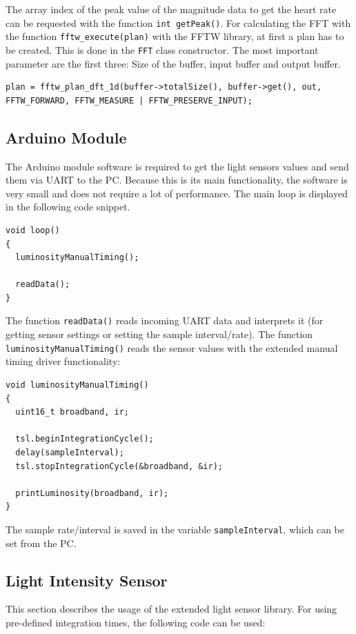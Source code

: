 \documentclass[notitlepage]{scrreprt}
\begin{document}
The array index of the peak value of the magnitude data to get the heart rate can be requested with the function \lstinline{int getPeak()}. For calculating the FFT with the function \lstinline{fftw_execute(plan)} with the FFTW library, at first a plan has to be created. This is done in the \lstinline{FFT} class constructor. The most important parameter are the first three: Size of the buffer, input buffer and output buffer.

\begin{lstlisting}[caption=FFT.c]
plan = fftw_plan_dft_1d(buffer->totalSize(), buffer->get(), out, FFTW_FORWARD, FFTW_MEASURE | FFTW_PRESERVE_INPUT);
\end{lstlisting}

\subsection{Arduino Module}
The Arduino module software is required to get the light sensors values and send them via UART to the PC. Because this is its main functionality, the software is very small and does not require a lot of performance. The main loop is displayed in the following code snippet.

\begin{lstlisting}
void loop()
{ 
  luminosityManualTiming();
  
  readData();
}
\end{lstlisting}

The function \lstinline{readData()} reads incoming UART data and interprets it (for getting sensor settings or setting the sample interval/rate). The function \lstinline{luminosityManualTiming()} reads the sensor values with the extended manual timing driver functionality:

\newpage

\begin{lstlisting}
void luminosityManualTiming()
{
  uint16_t broadband, ir;
  
  tsl.beginIntegrationCycle();
  delay(sampleInterval);
  tsl.stopIntegrationCycle(&broadband, &ir);
  
  printLuminosity(broadband, ir);
}
\end{lstlisting}

The sample rate/interval is saved in the variable \lstinline{sampleInterval}, which can be set from the PC.

\subsection{Light Intensity Sensor}
This section describes the usage of the extended light sensor library. For using pre-defined integration times, the following code can be used:
\end{document}
